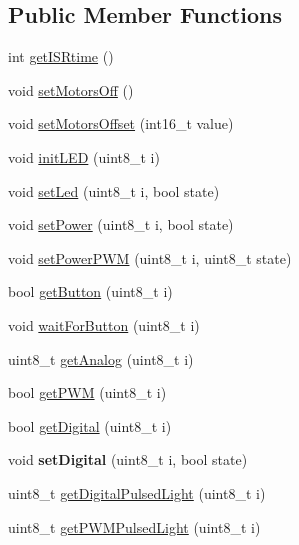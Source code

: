 \subsection*{Public Member Functions}
\begin{DoxyCompactItemize}
\item 
int \hyperlink{class_goldboard4_a65123cecbcc73fecadf6c11f888743af}{get\+I\+S\+Rtime} ()
\item 
void \hyperlink{class_goldboard4_a78c077cd2b846533cf1134f23dd2db79}{set\+Motors\+Off} ()
\item 
void \hyperlink{class_goldboard4_ac782bb10887e4cd6e58fcbe7b7d65623}{set\+Motors\+Offset} (int16\+\_\+t value)
\item 
void \hyperlink{class_goldboard4_a0c3134553d7136d32d46ea4641079c93}{init\+L\+ED} (uint8\+\_\+t i)
\item 
void \hyperlink{class_goldboard4_aedbe5a314f43d0da6dfed1bbb23b5ca2}{set\+Led} (uint8\+\_\+t i, bool state)
\item 
void \hyperlink{class_goldboard4_a09f18b8381af7830c2dc4214a6d84fbc}{set\+Power} (uint8\+\_\+t i, bool state)
\item 
void \hyperlink{class_goldboard4_a7fce81b6d0c23129da6e361badaefdf4}{set\+Power\+P\+WM} (uint8\+\_\+t i, uint8\+\_\+t state)
\item 
bool \hyperlink{class_goldboard4_aaf6ac85d732d07ffaa3ba88bed461a9a}{get\+Button} (uint8\+\_\+t i)
\item 
void \hyperlink{class_goldboard4_a2a83bb33f819b913fd63a95fe9a97bde}{wait\+For\+Button} (uint8\+\_\+t i)
\item 
uint8\+\_\+t \hyperlink{class_goldboard4_a81c498c9cfa45e7cc04883e561c24921}{get\+Analog} (uint8\+\_\+t i)
\item 
bool \hyperlink{class_goldboard4_a72afec46aecbca276d29e714ac5ab1b7}{get\+P\+WM} (uint8\+\_\+t i)
\item 
bool \hyperlink{class_goldboard4_a4fa6316d58b1e6b5b8174ee748b41216}{get\+Digital} (uint8\+\_\+t i)
\item 
void {\bfseries set\+Digital} (uint8\+\_\+t i, bool state)\hypertarget{class_goldboard4_a15872524d69b69fec2b00c63a90e5221}{}\label{class_goldboard4_a15872524d69b69fec2b00c63a90e5221}

\item 
uint8\+\_\+t \hyperlink{class_goldboard4_ac4f9d6eb4d800c68bffc065913427c73}{get\+Digital\+Pulsed\+Light} (uint8\+\_\+t i)
\item 
uint8\+\_\+t \hyperlink{class_goldboard4_abaedef75924a199b7779ce37028f11f8}{get\+P\+W\+M\+Pulsed\+Light} (uint8\+\_\+t i)
\end{DoxyCompactItemize}
